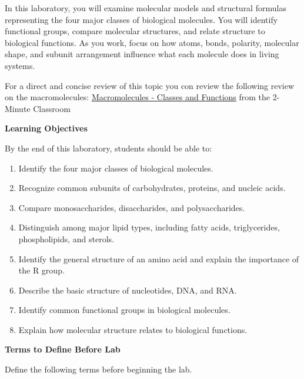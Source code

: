 \documentclass[
  letterpaper,
  DIV=11,
  numbers=noendperiod]{scrreprt}
\begin{document}
In this laboratory, you will examine molecular models and structural
formulas representing the four major classes of biological molecules.
You will identify functional groups, compare molecular structures, and
relate structure to biological functions. As you work, focus on how
atoms, bonds, polarity, molecular shape, and subunit arrangement
influence what each molecule does in living systems.

For a direct and concise review of this topic you con review the
following review on the macromolecules:
\href{https://youtu.be/V5hhrDFo8Vk?si=FMZE6Rc60Z9bBpFD}{Macromolecules -
Classes and Functions} from the 2-Minute Classroom

\textbf{Learning Objectives}

By the end of this laboratory, students should be able to:

\begin{enumerate}
\def\labelenumi{\arabic{enumi}.}
\item
  Identify the four major classes of biological molecules.
\item
  Recognize common subunits of carbohydrates, proteins, and nucleic
  acids.
\item
  Compare monosaccharides, disaccharides, and polysaccharides.
\item
  Distinguish among major lipid types, including fatty acids,
  triglycerides, phospholipids, and sterols.
\item
  Identify the general structure of an amino acid and explain the
  importance of the R group.
\item
  Describe the basic structure of nucleotides, DNA, and RNA.
\item
  Identify common functional groups in biological molecules.
\item
  Explain how molecular structure relates to biological functions.
\end{enumerate}

\textbf{Terms to Define Before Lab}

Define the following terms before beginning the lab.
\end{document}
